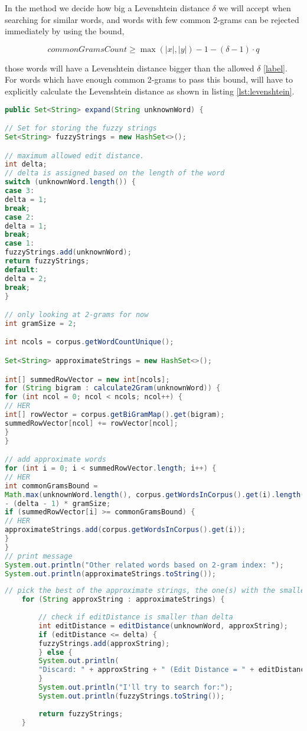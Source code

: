 In the  method we decide how big a Levenshtein distance \(\delta\) we will accept when searching for similar words, and words with few common 2-grams can be rejected immediately by using the bound,

\[ commonGramsCount \geq \max{(|x|, |y|) - 1 - (\delta -1 ) \cdot q } \]   

those words will have a Levenshtein distance bigger than the allowed \(\delta\) \ref{label}.  
For words which have enough common 2-grams to pass this bound, will have to explicitly calculate the Levenshtein distance as shown in listing \ref{lst:levenshtein}. 



\begin{lstlisting}[language=Java, caption=This is a code example., label=lst:2-gram]
public Set<String> expand(String unknownWord) {

// Set for storing the fuzzy strings
Set<String> fuzzyStrings = new HashSet<>();

// maximum allowed edit distance.
int delta;
// delta is assigned based on the length of the word
switch (unknownWord.length()) {
case 3:
delta = 1;
break;
case 2:
delta = 1;
break;
case 1:
fuzzyStrings.add(unknownWord);
return fuzzyStrings;
default:
delta = 2;
break;
}

// only looking at 2-grams for now
int gramSize = 2;

int ncols = corpus.getWordCountUnique();

Set<String> approximateStrings = new HashSet<>();

int[] summedRowVector = new int[ncols];
for (String bigram : calculate2Gram(unknownWord)) {
for (int ncol = 0; ncol < ncols; ncol++) {
// HER
int[] rowVector = corpus.getBiGramMap().get(bigram);
summedRowVector[ncol] += rowVector[ncol];
}
}

// add approximate words
for (int i = 0; i < summedRowVector.length; i++) {
// HER
int commonGramsBound =
Math.max(unknownWord.length(), corpus.getWordsInCorpus().get(i).length()) - 1
- (delta - 1) * gramSize;
if (summedRowVector[i] >= commonGramsBound) {
// HER
approximateStrings.add(corpus.getWordsInCorpus().get(i));
}
}
// print message
System.out.println("Other related words based on 2-gram index: ");
System.out.println(approximateStrings.toString());
\end{lstlisting}


\begin{lstlisting}[language=Java, caption=This is a code example., label=lst:2-gram]
	// pick the best of the approximate strings, the one(s) with the smallest edit distance.
	for (String approxString : approximateStrings) {
	
		// check if editDistance is smaller than delta
		int editDistance = editDistance(unknownWord, approxString);
		if (editDistance <= delta) {
		fuzzyStrings.add(approxString);
		} else {
		System.out.println(
		"Discard: " + approxString + " (Edit Distance = " + editDistance + " > " + delta + ")");
		}
		System.out.println("I'll try to search for:");
		System.out.println(fuzzyStrings.toString());
		
		return fuzzyStrings;
	}
\end{lstlisting}



